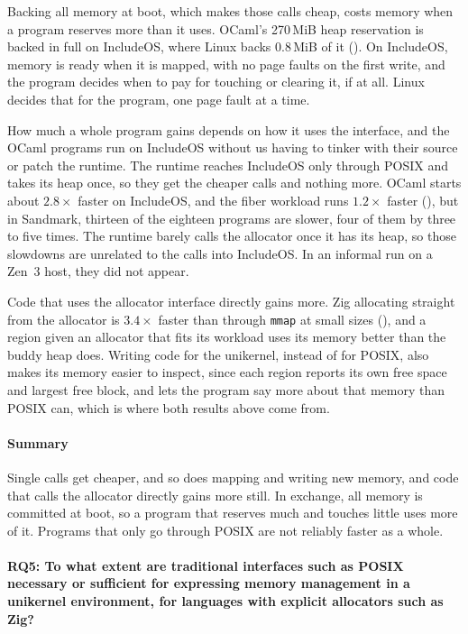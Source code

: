 \documentclass[12pt]{report}
\newcommand{\fullref}[1]{\Cref{#1}}
\renewcommand{\_}{\origunderscore\allowbreak}
\begin{document}
Backing all memory at boot, which makes those calls cheap, costs memory when a program reserves more than it uses. OCaml's 270\,MiB heap reservation is backed in full on IncludeOS, where Linux backs 0.8\,MiB of it (\fullref{sec:eval-ocaml}). On IncludeOS, memory is ready when it is mapped, with no page faults on the first write, and the program decides when to pay for touching or clearing it, if at all. Linux decides that for the program, one page fault at a time.

How much a whole program gains depends on how it uses the interface, and the OCaml programs run on IncludeOS without us having to tinker with their source or patch the runtime. The runtime reaches IncludeOS only through POSIX and takes its heap once, so they get the cheaper calls and nothing more. OCaml starts about $2.8\times$ faster on IncludeOS, and the fiber workload runs $1.2\times$ faster (\fullref{sec:eval-ocaml}), but in Sandmark, thirteen of the eighteen programs are slower, four of them by three to five times. The runtime barely calls the allocator once it has its heap, so those slowdowns are unrelated to the calls into IncludeOS. In an informal run on a Zen~3 host, they did not appear.

Code that uses the allocator interface directly gains more. Zig allocating straight from the allocator is $3.4\times$ faster than through \texttt{mmap} at small sizes (\fullref{sec:eval-posix-direct}), and a region given an allocator that fits its workload uses its memory better than the buddy heap does. Writing code for the unikernel, instead of for POSIX, also makes its memory easier to inspect, since each region reports its own free space and largest free block, and lets the program say more about that memory than POSIX can, which is where both results above come from.

\paragraph{Summary} Single calls get cheaper, and so does mapping and writing new memory, and code that calls the allocator directly gains more still. In exchange, all memory is committed at boot, so a program that reserves much and touches little uses more of it. Programs that only go through POSIX are not reliably faster as a whole.

\bigskip
\paragraph{RQ5: To what extent are traditional interfaces such as POSIX necessary or sufficient for expressing memory management in a unikernel environment, for languages with explicit allocators such as Zig?}
\end{document}
